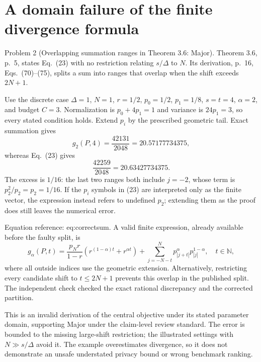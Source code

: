 \documentclass[10pt]{article}
\begin{document}
\section*{A domain failure of the finite divergence formula}
Problem 2 (Overlapping summation ranges in Theorem 3.6: Major).  Theorem 3.6, p. 5, states Eq. (23) with no restriction relating \(s/\Delta\) to \(N\). Its derivation, p. 16, Eqs. (70)–(75), splits a sum into ranges that overlap when the shift exceeds \(2N+1\).\par
Use the discrete case \(\Delta=1\), \(N=1\), \(r=1/2\), \(p_0=1/2\), \(p_1=1/8\), \(s=t=4\), \(\alpha=2\), and budget \(C=3\). Normalization is \(p_0+4p_1=1\) and variance is \(24p_1=3\), so every stated condition holds. Extend \(p_i\) by the prescribed geometric tail. Exact summation gives \[g_2(P,4)=\frac{42131}{2048}=20.57177734375,\] whereas Eq. (23) gives \[\frac{42259}{2048}=20.63427734375.\] The excess is \(1/16\): the last two ranges both include \(j=-2\), whose term is \(p_2^2/p_2=p_2=1/16\). If the \(p_i\) symbols in (23) are interpreted only as the finite vector, the expression instead refers to undefined \(p_2\); extending them as the proof does still leaves the numerical error.\par
Equation reference: eq:correctsum. A valid finite expression, already available before the faulty split, is \[
g_\alpha(P,t)=\frac{p_Nr}{1-r}
 \left(r^{(1-\alpha)t}+r^{\alpha t}\right)
 +\sum_{j=-N-t}^{N}p_{|j+t|}^{\alpha}p_{|j|}^{1-\alpha},
\quad t\in\mathbb N,\] where all outside indices use the geometric extension. Alternatively, restricting every candidate shift to \(t\le2N+1\) prevents this overlap in the published split. The independent check checked the exact rational discrepancy and the corrected partition.\par
This is an invalid derivation of the central objective under its stated parameter domain, supporting Major under the claim-level review standard. The error is bounded to the missing large-shift restriction; the illustrated settings with \(N\gg s/\Delta\) avoid it. The example overestimates divergence, so it does not demonstrate an unsafe understated privacy bound or wrong benchmark ranking.\par
\end{document}
